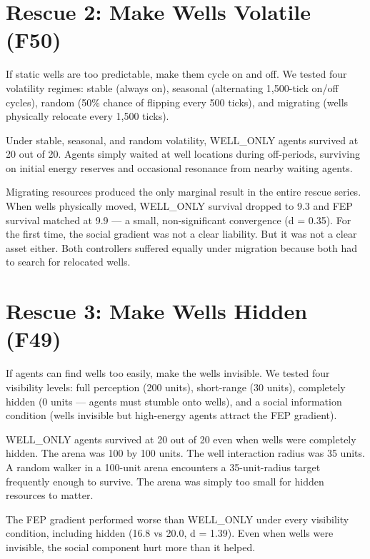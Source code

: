 \section{Rescue 2: Make Wells Volatile (F50)}\label{rescue-2-make-wells-volatile-f50}

If static wells are too predictable, make them cycle on and off. We tested four volatility regimes: stable (always on), seasonal (alternating 1,500-tick on/off cycles), random (50\% chance of flipping every 500 ticks), and migrating (wells physically relocate every 1,500 ticks).

Under stable, seasonal, and random volatility, WELL\_ONLY agents survived at 20 out of 20. Agents simply waited at well locations during off-periods, surviving on initial energy reserves and occasional resonance from nearby waiting agents.

Migrating resources produced the only marginal result in the entire rescue series. When wells physically moved, WELL\_ONLY survival dropped to 9.3 and FEP survival matched at 9.9 --- a small, non-significant convergence (d = 0.35). For the first time, the social gradient was not a clear liability. But it was not a clear asset either. Both controllers suffered equally under migration because both had to search for relocated wells.

\section{Rescue 3: Make Wells Hidden (F49)}\label{rescue-3-make-wells-hidden-f49}

If agents can find wells too easily, make the wells invisible. We tested four visibility levels: full perception (200 units), short-range (30 units), completely hidden (0 units --- agents must stumble onto wells), and a social information condition (wells invisible but high-energy agents attract the FEP gradient).

WELL\_ONLY agents survived at 20 out of 20 even when wells were completely hidden. The arena was 100 by 100 units. The well interaction radius was 35 units. A random walker in a 100-unit arena encounters a 35-unit-radius target frequently enough to survive. The arena was simply too small for hidden resources to matter.

The FEP gradient performed worse than WELL\_ONLY under every visibility condition, including hidden (16.8 vs 20.0, d = 1.39). Even when wells were invisible, the social component hurt more than it helped.


